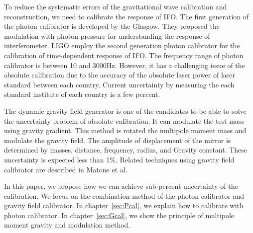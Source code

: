\documentclass[]{spie}  %
\begin{document}
To reduce the systematic errors of the gravitational wave calibration and reconstruction, we need to calibrate the response of IFO. The first generation of the photon calibrator is developed by the Glasgow. They proposed the modulation with photon pressure for understanding the response of interferometer. LIGO employ the second generation photon calibrator for the calibration of time-dependent response of IFO.  The frequency range of photon calibrator is between 10 and 3000Hz.  However, it has a challenging issue of the absolute calibration due to the accuracy of the absolute laser power of laser standard between each country. Current uncertainty by measuring the each standard institute of each country is a few percent.

The dynamic gravity field generator is one of the candidates to be able to solve the uncertainty problem of absolute calibration. It can modulate the test mass using gravity gradient. This method is rotated the multipole moment mass and modulate the gravity field. The amplitude of displacement of the mirror is determined by masses, distance, frequency, radius, and Gravity constant. These uncertainty is expected less than 1\%. Related techniques using gravity field calibrator are described in Matone et al.

In this paper, we propose how we can achieve sub-percent uncertainty of the calibration. We focus on the combination method of the photon calibrator and gravity field calibrator.
In chapter~\ref{sec:Pcal}, we explain how to calibrate with photon calibrator. In chapter~\ref{sec:Gcal}, we show the principle of multipole moment gravity and modulation method.
\end{document}
